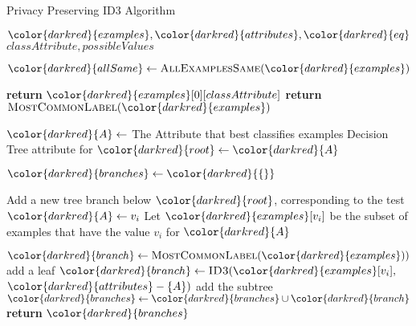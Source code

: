 \begin{algorithm}[t]
\caption{Privacy Preserving ID3 Algorithm }\label{a:id3-pp}
\begin{algorithmic}[1]
\renewcommand{\algorithmicrequire}{\textbf{Private Vars:}}
\Require ${\color{darkred}{examples}}, {\color{darkred}{attributes}}, {\color{darkred}{eq}}$
\renewcommand{\algorithmicrequire}{\textbf{Global Vars:}}
\Require $classAttribute, possibleValues$

    \State ${\color{darkred}{allSame}} \gets \textsc{AllExamplesSame}({\color{darkred}{examples}})$

        \State \textbf{return} ${\color{darkred}{examples}}[0][classAttribute]$
        \State \textbf{return} $\textsc{MostCommonLabel}({\color{darkred}{examples}})$
    \EndIf

    \State ${\color{darkred}{A}} \gets$ The Attribute that best classifies examples
    \State Decision Tree attribute for ${\color{darkred}{root}} \gets {\color{darkred}{A}}$

    \State ${\color{darkred}{branches}} \gets {\color{darkred}{\{\}}}$

        \State Add a new tree branch below ${\color{darkred}{root}}$, corresponding to the test ${\color{darkred}{A}} \gets v_i$
        \State Let ${\color{darkred}{examples}}[v_i]$ be the subset of examples that have the value $v_i$ for ${\color{darkred}{A}}$

            \State ${\color{darkred}{branch}} \gets \textsc{MostCommonLabel}({\color{darkred}{examples}}))$ add a leaf
        \Else
            \State ${\color{darkred}{branch}} \gets \textsc{ID3}({\color{darkred}{examples}}[v_i],$ ${\color{darkred}{attributes}} - \{A\})$ add the subtree
        \EndIf
        \State ${\color{darkred}{branches}} \gets {\color{darkred}{branches}} \cup {\color{darkred}{branch}}$
    \EndFor
    \State \textbf{return} ${\color{darkred}{branches}}$

\EndProcedure

\end{algorithmic}
\end{algorithm}

